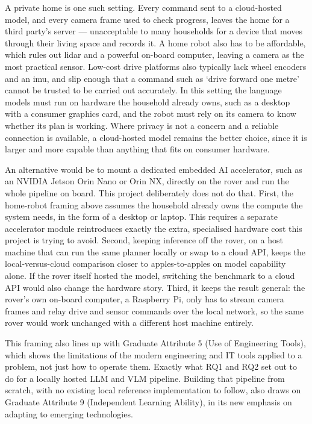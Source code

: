 A private home is one such setting. Every command sent to a cloud-hosted model, and every
camera frame used to check progress, leaves the home for a third party's server — unacceptable
to many households for a device that moves through their living space and records it. A home
robot also has to be affordable, which rules out \acs{lidar} and a powerful on-board computer,
leaving a camera as the most practical sensor. Low-cost drive platforms also typically lack
wheel encoders and an \ac{imu}, and slip enough that a command such as `drive forward one
metre' cannot be trusted to be carried out accurately. In this setting the language models
must run on hardware the household already owns, such as a desktop with a consumer graphics
card, and the robot must rely on its camera to know whether its plan is working. Where privacy
is not a concern and a reliable connection is available, a cloud-hosted model remains the
better choice, since it is larger and more capable than anything that fits on consumer
hardware.

An alternative would be to mount a dedicated embedded AI accelerator, such as an NVIDIA Jetson
Orin Nano or Orin NX, directly on the rover and run the whole pipeline on board. This project
deliberately does not do that. First, the home-robot framing above assumes the household
already owns the compute the system needs, in the form of a desktop or laptop. This requires a
separate accelerator module reintroduces exactly the extra, specialised hardware cost this
project is trying to avoid. Second, keeping inference off the rover, on a host machine that can
run the same planner locally or swap to a cloud API, keeps the local-versus-cloud comparison
closer to apples-to-apples on model capability alone. If the rover itself hosted the model,
switching the benchmark to a cloud API would also change the hardware story. Third, it keeps
the result general: the rover's own on-board computer, a Raspberry Pi, only has to stream
camera frames and relay drive and sensor commands over the local network, so the same rover
would work unchanged with a different host machine entirely.

This framing also lines up with Graduate Attribute 5 (Use of Engineering Tools), which shows the
limitations of the modern engineering and IT tools applied to a problem, not just how to
operate them. Exactly what RQ1 and RQ2 set out to do for a locally hosted LLM and VLM
pipeline. Building that pipeline from scratch, with no existing local reference implementation
to follow, also draws on Graduate Attribute 9 (Independent Learning Ability), in its new
emphasis on adapting to emerging technologies.

